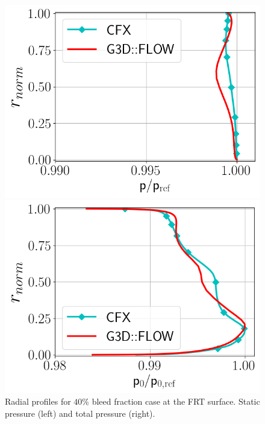 \begin{figure}[h!]
  \centering
  \begin{minipage}{0.48\columnwidth}
  \includegraphics[width=1.\textwidth]{figures/PAaveB40_FRT.png}
  \end{minipage}
  \begin{minipage}{0.48\columnwidth}
  \includegraphics[width=1.\textwidth]{figures/P0MaveB40_FRT.png}
  \end{minipage}
  \caption{Radial profiles for $40\%$ bleed fraction case at the FRT surface. Static pressure (left) and total pressure (right).} \label{fig:FRT40}
\end{figure}
